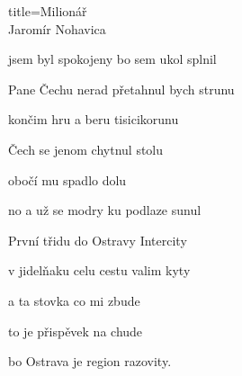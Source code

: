 \begin{song}{title=\centering Milionář \\\normalsize Jaromír Nohavica  \vspace*{-0.3cm}}
{\begin{minipage}[t]{0.48\textwidth}
jsem byl spokojeny bo sem ukol splnil 

\sloka
Pane Čechu nerad přetahnul bych strunu 

končim hru a beru tisicikorunu 

Čech se jenom chytnul stolu 

obočí mu spadlo dolu 

no a už se modry ku podlaze sunul 

\sloka
První třidu do Ostravy Intercity 

v jidelňaku celu cestu valim kyty 

a ta stovka co mi zbude 

to je přispěvek na chude 

bo Ostrava je region razovity.


\end{minipage}
}
\setcounter{Slokočet}{0}
\end{song}